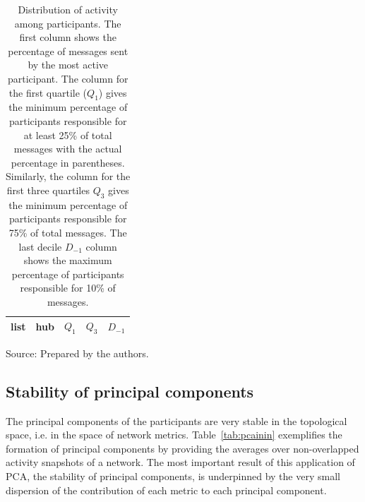 																	\begin{table}[h]
																	\caption{Distribution of activity among participants.
																	The first column shows the percentage of messages sent by the most active participant. The column for the first quartile ($Q_1$) gives the minimum percentage of participants responsible for at least 25\% of total messages with the actual percentage in parentheses. Similarly, the column for the first three quartiles $Q_3$ gives the minimum percentage of participants responsible for 75\% of total messages.
																	The last decile $D_{-1}$ column shows the maximum percentage of participants responsible for 10\% of messages.}
																	\begin{center}
																	\begin{tabular}{ | l ||  c | c | c | c | }
																	\hline
																	list & hub & $ Q_1 $ & $ Q_3 $ & $D_{-1}$ \\ \hline
																	
																	\end{tabular}
																	\end{center}
																	\begin{flushleft}
																			Source: Prepared by the authors.\
																			\end{flushleft}
																			\label{autores}
																			\end{table}


																			\subsection{Stability of principal components}\label{prevalence}

																			The principal components of the participants are very stable in the topological space,
																			i.e. in the space of network metrics.
																			Table~\ref{tab:pcainin} exemplifies the formation of principal components by providing the averages over non-overlapped activity snapshots of a network. The most important result of this application of PCA, the stability of principal components, is underpinned by the very small dispersion of the contribution of each metric to each principal component.

